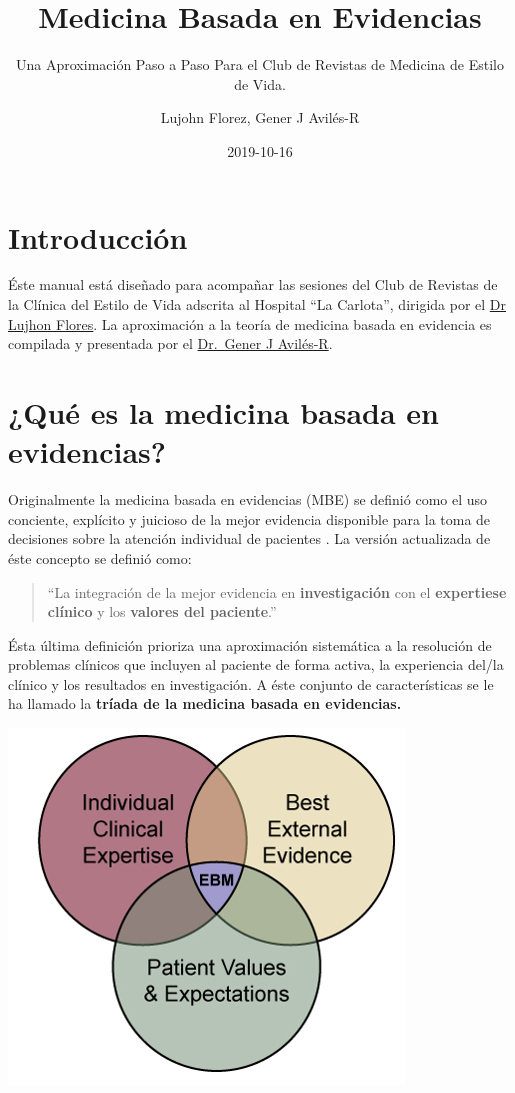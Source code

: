 \documentclass[]{book}
\title{Medicina Basada en Evidencias}
\subtitle{Una Aproximación Paso a Paso Para el Club de Revistas de Medicina de Estilo de Vida.}
\author{Lujohn Florez, Gener J Avilés-R}
\date{2019-10-16}
\begin{document}
\maketitle

{
\setcounter{tocdepth}{1}
\tableofcontents
}
\hypertarget{introduccion}{%
\chapter{Introducción}\label{introduccion}}

Éste manual está diseñado para acompañar las sesiones del Club de Revistas de la Clínica del Estilo de Vida adscrita al Hospital ``La Carlota'', dirigida por el \href{https://www.linkedin.com/in/lujohnflorez/}{Dr Lujhon Flores}.
La aproximación a la teoría de medicina basada en evidencia es compilada y presentada por el \href{https://www.linkedin.com/in/generaviles/}{Dr.~Gener J Avilés-R}.

\hypertarget{intro}{%
\chapter{¿Qué es la medicina basada en evidencias?}\label{intro}}

Originalmente la medicina basada en evidencias (MBE) se definió como el uso conciente, explícito y juicioso de la mejor evidencia disponible para la toma de decisiones sobre la atención individual de pacientes \citep{sackett1996evidence}.
La versión actualizada de éste concepto se definió como:

\begin{quote}
``La integración de la mejor evidencia en \textbf{investigación} con el \textbf{expertiese clínico} y los \textbf{valores del paciente}.'' \citep{straus2018evidence}
\end{quote}

Ésta última definición prioriza una aproximación sistemática a la resolución de problemas clínicos que incluyen al paciente de forma activa, la experiencia del/la clínico y los resultados en investigación. A éste conjunto de características se le ha llamado la \textbf{tríada de la medicina basada en evidencias.}

\includegraphics{img/EBM.png}
\end{document}
